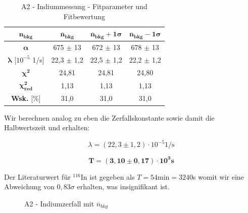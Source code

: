 \documentclass{article}
\begin{document}
\begin{table}[!h]
    \centering
    \begin{tabular}{c|ccc}
        \hline
        $\bm{n_{bkg}}$ & $\bm{\overline{n}_{bkg}}$ & $\bm{\overline{n}_{bkg} + 1\sigma}$ & $\bm{\overline{n}_{bkg} - 1\sigma}$ \\ \hline
        $\bm{\alpha}$ & 675 $\pm$ 13 & 672 $\pm$ 13 & 678 $\pm$ 13 \\
        $\bm{\lambda}$ [$10^{-5}$ 1/s] & 22,3 $\pm$ 1,2 & 22,5 $\pm$ 1,2 & 22,2 $\pm$ 1,2 \\ \hline
        $\bm{\chi^2}$ & 24,81 & 24,81 & 24,80  \\
        $\bm{\chi^2_{red}}$ & 1,13 & 1,13 & 1,13  \\
        \textbf{Wsk.} [\%] & 31,0 & 31,0 & 31,0  \\ \hline
    \end{tabular}%
    \caption{A2 - Indiummessung - Fitparameter und Fitbewertung}
    \label{tab:A2-Fits}
\end{table}

\phantom{.}

Wir berechnen analog zu eben die Zerfallskonstante sowie damit die Halbwertszeit und erhalten:

\begin{equation}
    \lambda = (22,3 \pm 1,2) \cdot 10^{-5} 1/\text{s}
\end{equation}

\begin{equation}
    \bm{T = (3,10 \pm 0,17) \cdot 10^3} \textbf{s}
\end{equation}

Der Literaturwert für $^{116}$In ist gegeben als $T = 54 \text{min} = 3240$s womit wir eine Abweichung von $0,83\sigma$ erhalten, was insignifikant ist.

\begin{figure}[!h]
    \centering
    \caption{A2 - Indiumzerfall mit $\overline{n}_{bkg}$}
    \label{fig:A2-ImUG}
\end{figure}
\end{document}
